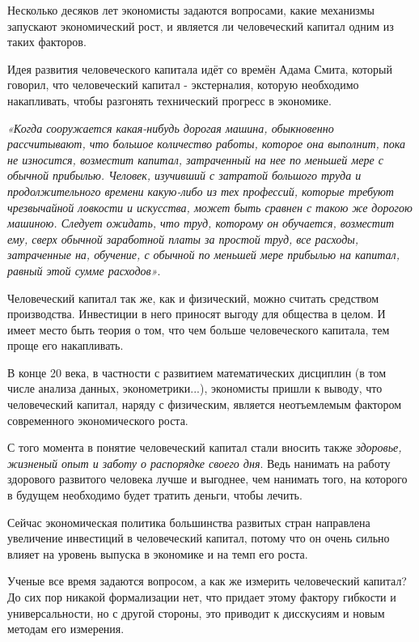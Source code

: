 \documentclass[reqno]{article}
\theoremstyle{definition}
\theoremstyle{definition}
\theoremstyle{definition}
\theoremstyle{definition}
\theoremstyle{definition}
\theoremstyle{definition}
\theoremstyle{definition}
\theoremstyle{definition}
\theoremstyle{definition}
\begin{document}
		Несколько десяков лет экономисты задаются вопросами, какие механизмы запускают экономический рост, и является ли человеческий капитал одним из таких факторов.
		
		Идея развития человеческого капитала идёт со времён Адама Смита, который говорил, что человеческий капитал - 	экстерналия, которую необходимо накапливать, чтобы разгонять технический прогресс в экономике.
		
		\begin{center}
			\emph{«Когда сооружается какая-нибудь дорогая машина, обыкновенно рассчитывают, что большое количество работы, которое она выполнит, пока не износится, возместит капитал, затраченный на нее по меньшей мере с обычной прибылью. Человек, изучивший с затратой большого труда и продолжительного времени какую-либо из тех профессий, которые требуют чрезвычайной ловкости и искусства, может быть сравнен с такою же дорогою машиною. Следует ожидать, что труд, которому он обучается, возместит ему, сверх обычной заработной платы за простой труд, все расходы, затраченные на, обучение, с обычной по меньшей мере прибылью на капитал, равный этой сумме расходов»}.
		\end{center}
		
		Человеческий капитал так же, как и физический, можно считать средством производства. Инвестиции в него приносят выгоду для общества в целом. И имеет место быть теория о том, что чем больше человеческого капитала, тем проще его накапливать. 
		
		В конце 20 века, в частности с развитием математических дисциплин (в том числе анализа данных, эконометрики...), экономисты пришли к выводу, что человеческий капитал, наряду с физическим, является неотъемлемым фактором современного экономического роста.
		
		С того момента в понятие человеческий капитал стали вносить также \emph{здоровье, жизненый опыт и заботу о распорядке своего дня}. Ведь нанимать на работу здорового развитого человека лучше и выгоднее, чем нанимать того, на которого в будущем необходимо будет тратить деньги, чтобы лечить.
		
		Сейчас экономическая политика большинства развитых стран направлена увеличение инвестиций в человеческий капитал, потому что он очень сильно влияет на уровень выпуска в экономике и на темп его роста.  
		
		Ученые все время задаются вопросом, а как же измерить человеческий капитал? До сих пор никакой формализации нет, что придает этому фактору гибкости и универсальности, но с другой стороны, это приводит к дисскусиям и новым методам его измерения. 
		
\end{document}
